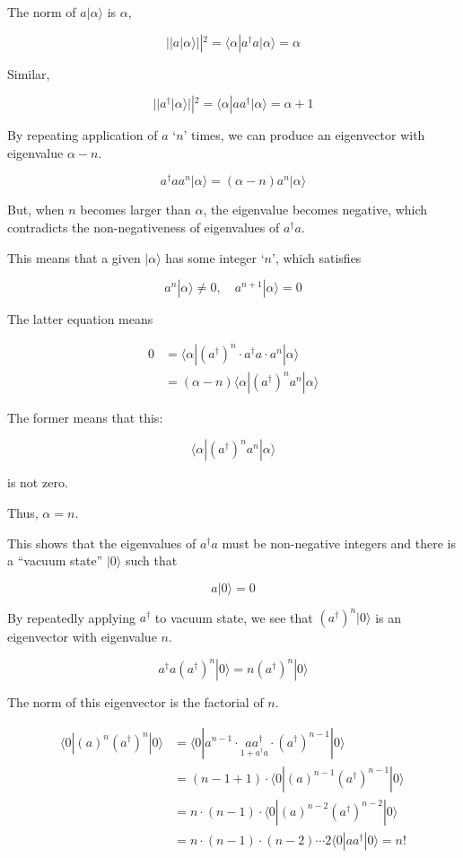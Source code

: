 The norm of $a|\alpha\rangle$ is $\alpha$,

\[||a|\alpha\rangle||^2 = \langle\alpha|a^{\dagger}a|\alpha\rangle = \alpha \]

Similar,

\[||a^{\dagger}|\alpha\rangle||^2 = \langle\alpha|aa^{\dagger}|\alpha\rangle = \alpha + 1 \]

By repeating application of $a$ `$n$' times, we can produce an eigenvector with eigenvalue $\alpha - n$.

\[a^{\dagger}a a^n|\alpha\rangle = (\alpha - n)a^n|\alpha\rangle \]

But, when $n$ becomes larger than $\alpha$, the eigenvalue becomes negative, which contradicts the non-negativeness of eigenvalues of $a^{\dagger}a$.

This means that a given $|\alpha\rangle$ has some integer `$n$', which satisfies

\[a^n|\alpha\rangle \neq 0,\quad a^{n+1}|\alpha\rangle = 0 \]

The latter equation means

\[\begin{split}
0 &= \langle\alpha|(a^{\dagger})^n \cdot a^{\dagger}a\cdot a^n|\alpha\rangle\\
&=(\alpha - n)\langle\alpha|(a^{\dagger})^n a^n|\alpha\rangle
\end{split} \]

The former means that this:

\[\langle\alpha|(a^{\dagger})^n a^n|\alpha\rangle \]

is not zero.

Thus, $\alpha = n$.

This shows that the eigenvalues of $a^{\dagger}a$ must be non-negative integers and there is a ``vacuum state'' $|0\rangle$ such that

\[a|0\rangle = 0 \]

By repeatedly applying $a^{\dagger}$ to vacuum state, we see that $(a^{\dagger})^n|0\rangle$ is an eigenvector with eigenvalue $n$.

\[a^{\dagger}a(a^{\dagger})^n|0\rangle = n(a^{\dagger})^n|0\rangle \]

The norm of this eigenvector is the factorial of $n$.

\[\begin{split}
\langle 0|(a)^n(a^{\dagger})^n|0\rangle &=  \langle 0|a^{n-1}\cdot \underset{1+a^{\dagger}a}{aa^{\dagger}}\cdot(a^{\dagger})^{n-1}|0\rangle\\
&= (n-1+1)\cdot\langle 0|(a)^{n-1}(a^{\dagger})^{n-1}|0\rangle\\
&= n\cdot(n-1)\cdot\langle 0|(a)^{n-2}(a^{\dagger})^{n-2}|0\rangle\\
&= n\cdot(n-1)\cdot(n-2)\cdots 2 \langle 0|aa^{\dagger}|0\rangle = n!
\end{split}\]


